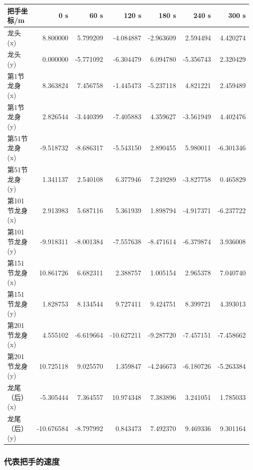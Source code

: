 \documentclass[
  11pt,
  UTF8]{ctexart}
\begin{document}
\begin{longtable}[]{@{}lrrrrrr@{}}
\toprule
把手坐标/m & 0 s & 60 s & 120 s & 180 s & 240 s & 300 s \\
\midrule
\endhead
龙头 (x) & 8.800000 & 5.799209 & -4.084887 & -2.963609 & 2.594494 &
4.420274 \\
龙头 (y) & 0.000000 & -5.771092 & -6.304479 & 6.094780 & -5.356743 &
2.320429 \\
第1节龙身 (x) & 8.363824 & 7.456758 & -1.445473 & -5.237118 & 4.821221 &
2.459489 \\
第1节龙身 (y) & 2.826544 & -3.440399 & -7.405883 & 4.359627 & -3.561949
& 4.402476 \\
第51节龙身 (x) & -9.518732 & -8.686317 & -5.543150 & 2.890455 & 5.980011
& -6.301346 \\
第51节龙身 (y) & 1.341137 & 2.540108 & 6.377946 & 7.249289 & -3.827758 &
0.465829 \\
第101节龙身 (x) & 2.913983 & 5.687116 & 5.361939 & 1.898794 & -4.917371
& -6.237722 \\
第101节龙身 (y) & -9.918311 & -8.001384 & -7.557638 & -8.471614 &
-6.379874 & 3.936008 \\
第151节龙身 (x) & 10.861726 & 6.682311 & 2.388757 & 1.005154 & 2.965378
& 7.040740 \\
第151节龙身 (y) & 1.828753 & 8.134544 & 9.727411 & 9.424751 & 8.399721 &
4.393013 \\
第201节龙身 (x) & 4.555102 & -6.619664 & -10.627211 & -9.287720 &
-7.457151 & -7.458662 \\
第201节龙身 (y) & 10.725118 & 9.025570 & 1.359847 & -4.246673 &
-6.180726 & -5.263384 \\
龙尾（后）(x) & -5.305444 & 7.364557 & 10.974348 & 7.383896 & 3.241051 &
1.785033 \\
龙尾（后）(y) & -10.676584 & -8.797992 & 0.843473 & 7.492370 & 9.469336
& 9.301164 \\
\bottomrule
\end{longtable}

\hypertarget{ux4ee3ux8868ux628aux624bux7684ux901fux5ea6}{%
\subsubsection{代表把手的速度}\label{ux4ee3ux8868ux628aux624bux7684ux901fux5ea6}}
\end{document}

